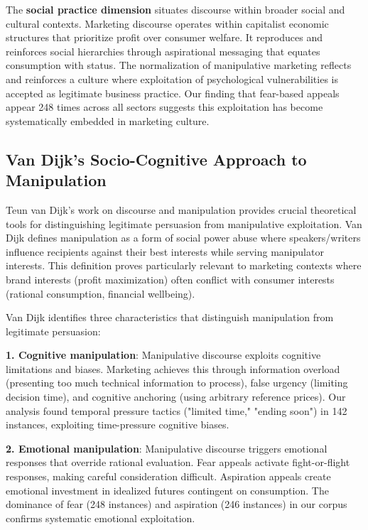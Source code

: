 The \textbf{social practice dimension} situates discourse within broader social and cultural contexts. Marketing discourse operates within capitalist economic structures that prioritize profit over consumer welfare. It reproduces and reinforces social hierarchies through aspirational messaging that equates consumption with status. The normalization of manipulative marketing reflects and reinforces a culture where exploitation of psychological vulnerabilities is accepted as legitimate business practice. Our finding that fear-based appeals appear 248 times across all sectors suggests this exploitation has become systematically embedded in marketing culture.

\subsection{Van Dijk's Socio-Cognitive Approach to Manipulation}

Teun van Dijk's work on discourse and manipulation provides crucial theoretical tools for distinguishing legitimate persuasion from manipulative exploitation. Van Dijk defines manipulation as a form of social power abuse where speakers/writers influence recipients against their best interests while serving manipulator interests. This definition proves particularly relevant to marketing contexts where brand interests (profit maximization) often conflict with consumer interests (rational consumption, financial wellbeing).

Van Dijk identifies three characteristics that distinguish manipulation from legitimate persuasion:

\textbf{1. Cognitive manipulation}: Manipulative discourse exploits cognitive limitations and biases. Marketing achieves this through information overload (presenting too much technical information to process), false urgency (limiting decision time), and cognitive anchoring (using arbitrary reference prices). Our analysis found temporal pressure tactics ("limited time," "ending soon") in 142 instances, exploiting time-pressure cognitive biases.

\textbf{2. Emotional manipulation}: Manipulative discourse triggers emotional responses that override rational evaluation. Fear appeals activate fight-or-flight responses, making careful consideration difficult. Aspiration appeals create emotional investment in idealized futures contingent on consumption. The dominance of fear (248 instances) and aspiration (246 instances) in our corpus confirms systematic emotional exploitation.

